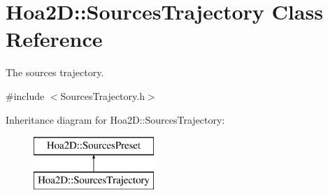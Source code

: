 \hypertarget{class_hoa2_d_1_1_sources_trajectory}{\section{Hoa2\-D\-:\-:Sources\-Trajectory Class Reference}
\label{class_hoa2_d_1_1_sources_trajectory}
}


The sources trajectory.  




{\ttfamily \#include $<$Sources\-Trajectory.\-h$>$}

Inheritance diagram for Hoa2\-D\-:\-:Sources\-Trajectory\-:\begin{figure}[H]
\begin{center}
\leavevmode
\includegraphics[height=2.000000cm]{class_hoa2_d_1_1_sources_trajectory}
\end{center}
\end{figure}
